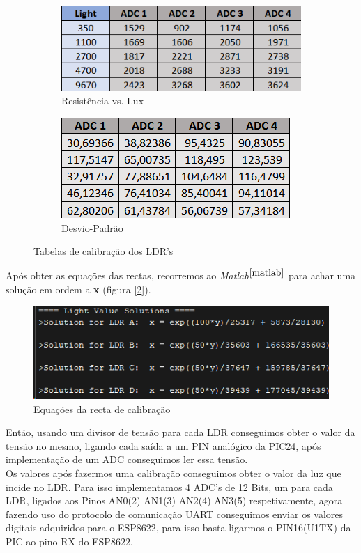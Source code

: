 \documentclass[12pt]{article}
\begin{document}
\begin{figure}[H]
  \centering
  \begin{subfigure}[b]{0.5\linewidth}
    \includegraphics[width=\linewidth]{imgs/tabadc1.png}
    \caption{Resistência vs. Lux}
  \end{subfigure}
  \begin{subfigure}[b]{0.4\linewidth}
    \includegraphics[width=\linewidth]{imgs/tabadc2.png}
    \caption{Desvio-Padrão}
  \end{subfigure}
  \caption{Tabelas de calibração dos LDR's}
  \label{fig:LDR_calib_tab}
\end{figure}

Após obter as equações das rectas, recorremos ao \textit{Matlab}$^{\cite{matlab}}$ para achar uma solução em ordem a \textbf{x} (figura [\ref{fig:matlab}]).

\begin{figure}[H]
        \centering
        \includegraphics[width=0.7\linewidth]{imgs/matlab.png}
        \caption{Equações da recta de calibração}
        \label{fig:matlab}
\end{figure}

Então, usando um divisor de tensão para cada LDR conseguimos obter o valor da tensão no mesmo, ligando cada saída a um PIN analógico da PIC24, após implementação de um ADC conseguimos ler essa tensão.\\
Os valores após fazermos uma calibração conseguimos obter o valor da luz que incide no LDR.
Para isso implementamos 4 ADC's de 12 Bits, um para cada LDR, ligados aos Pinos AN0(2) AN1(3) AN2(4) AN3(5) respetivamente, agora fazendo uso do protocolo de comunicação UART conseguimos enviar os valores digitais adquiridos para o ESP8622, para isso basta ligarmos o PIN16(U1TX) da PIC ao pino RX do ESP8622.
\end{document}
